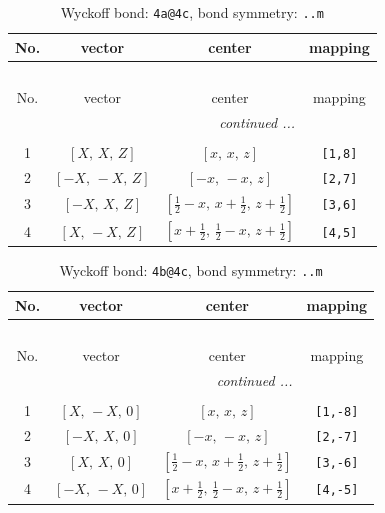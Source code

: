 \documentclass[fleqn,8pt]{jsarticle}
\begin{document}
\begin{longtable}{cccc}
\caption{Wyckoff bond: {\tt 4a@4c}, bond symmetry: {\tt ..m}}
 \\
 \hline \hline
No. & vector & center & mapping \\ \hline \endfirsthead

\multicolumn{3}{l}{\tablename\ \thetable{}} \\
 \hline \hline
No. & vector & center & mapping \\ \hline \endhead

 \hline \hline
\multicolumn{3}{r}{\footnotesize\it continued ...} \\ \endfoot

 \hline \hline
\multicolumn{3}{r}{} \\ \endlastfoot

1 & $\left[ X,\, X,\, Z \right]$ & $\left[ x,\, x,\, z \right]$ & {\tt [1,8]} \\ \hline
2 & $\left[ - X,\, - X,\, Z \right]$ & $\left[ - x,\, - x,\, z \right]$ & {\tt [2,7]} \\ \hline
3 & $\left[ - X,\, X,\, Z \right]$ & $\left[ \frac{1}{2} - x,\, x + \frac{1}{2},\, z + \frac{1}{2} \right]$ & {\tt [3,6]} \\ \hline
4 & $\left[ X,\, - X,\, Z \right]$ & $\left[ x + \frac{1}{2},\, \frac{1}{2} - x,\, z + \frac{1}{2} \right]$ & {\tt [4,5]} \\
\end{longtable}
\renewcommand{\arraystretch}{1.2}
\begin{longtable}{cccc}
\caption{Wyckoff bond: {\tt 4b@4c}, bond symmetry: {\tt ..m}}
 \\
 \hline \hline
No. & vector & center & mapping \\ \hline \endfirsthead

\multicolumn{3}{l}{\tablename\ \thetable{}} \\
 \hline \hline
No. & vector & center & mapping \\ \hline \endhead

 \hline \hline
\multicolumn{3}{r}{\footnotesize\it continued ...} \\ \endfoot

 \hline \hline
\multicolumn{3}{r}{} \\ \endlastfoot

1 & $\left[ X,\, - X,\, 0 \right]$ & $\left[ x,\, x,\, z \right]$ & {\tt [1,-8]} \\ \hline
2 & $\left[ - X,\, X,\, 0 \right]$ & $\left[ - x,\, - x,\, z \right]$ & {\tt [2,-7]} \\ \hline
3 & $\left[ X,\, X,\, 0 \right]$ & $\left[ \frac{1}{2} - x,\, x + \frac{1}{2},\, z + \frac{1}{2} \right]$ & {\tt [3,-6]} \\ \hline
4 & $\left[ - X,\, - X,\, 0 \right]$ & $\left[ x + \frac{1}{2},\, \frac{1}{2} - x,\, z + \frac{1}{2} \right]$ & {\tt [4,-5]} \\
\end{longtable}
\end{document}
